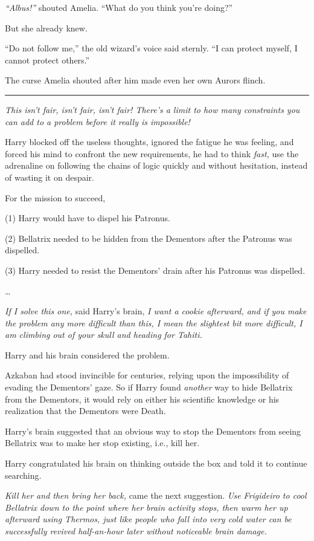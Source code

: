 \emph{``Albus!''} shouted Amelia. ``What do you think you're doing?''

But she already knew.

``Do not follow me,'' the old wizard's voice said sternly. ``I can
protect myself, I cannot protect others.''

The curse Amelia shouted after him made even her own Aurors flinch.

\begin{center}\rule{3in}{0.4pt}\end{center}

\emph{This isn't fair, isn't fair, isn't fair! There's a limit to how
many constraints you can add to a problem before it really is
impossible!}

Harry blocked off the useless thoughts, ignored the fatigue he was
feeling, and forced his mind to confront the new requirements, he had to
think \emph{fast,} use the adrenaline on following the chains of logic
quickly and without hesitation, instead of wasting it on despair.

For the mission to succeed,

​(1) Harry would have to dispel his Patronus.

​(2) Bellatrix needed to be hidden from the Dementors after the Patronus
was dispelled.

​(3) Harry needed to resist the Dementors' drain after his Patronus was
dispelled.

\ldots{}

\emph{If I solve this one,} said Harry's brain, \emph{I want a cookie
afterward, and if you make the problem any more difficult than this, I
mean the slightest bit more difficult, I am climbing out of your skull
and heading for Tahiti.}

Harry and his brain considered the problem.

Azkaban had stood invincible for centuries, relying upon the
impossibility of evading the Dementors' gaze. So if Harry found
\emph{another} way to hide Bellatrix from the Dementors, it would rely
on either his scientific knowledge or his realization that the Dementors
were Death.

Harry's brain suggested that an obvious way to stop the Dementors from
seeing Bellatrix was to make her stop existing, i.e., kill her.

Harry congratulated his brain on thinking outside the box and told it to
continue searching.

\emph{Kill her and then bring her back,} came the next suggestion.
\emph{Use Frigideiro to cool Bellatrix down to the point where her brain
activity stops, then warm her up afterward using Thermos, just like
people who fall into very cold water can be successfully revived
half-an-hour later without noticeable brain damage.}

